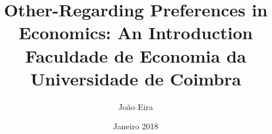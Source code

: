 \documentclass[12pt]{article}
\title{
	{Other-Regarding Preferences in Economics: An Introduction}\\
	{\large Faculdade de Economia da Universidade de Coimbra}\\
}
\author{João Eira}
\date{Janeiro 2018}
\begin{document}
	\nocite{*}
	
	
\end{document}
